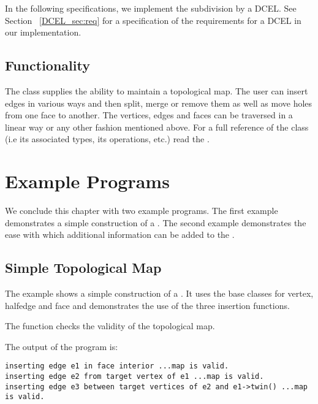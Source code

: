 In the following
specifications, we implement the subdivision by a DCEL. See Section
~\ref{DCEL_sec:req}
for a specification of the requirements for a DCEL in our implementation.

\subsection*{Functionality}

The class  supplies the ability to maintain
a topological map. The user can insert edges in various ways and then split,
merge or remove them as well as move holes from one face to another.
The vertices, edges and faces can be traversed in a 
linear way or any other fashion mentioned above.
For a full reference of the class (i.e its associated types,
its operations, etc.) read the .


\section{Example Programs}
\label{TPM_sec:example}
We conclude this chapter with two example programs. The first example
demonstrates a simple construction of a . The 
second example demonstrates the ease with which additional information can
be added to the .

\subsection{Simple Topological Map}
The example shows a simple construction of a .
It uses the base classes for vertex, halfedge and face and demonstrates
the use of the three insertion functions.

The function  checks the validity of the topological map.


The output of the program is:

\begin{verbatim}
inserting edge e1 in face interior ...map is valid.
inserting edge e2 from target vertex of e1 ...map is valid.
inserting edge e3 between target vertices of e2 and e1->twin() ...map is valid.

\end{verbatim}

